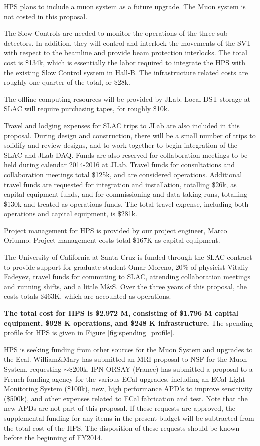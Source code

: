 HPS plans to include a muon system as a future upgrade. The Muon system is not costed in this proposal.

The Slow Controls are needed to monitor the operations of the three sub-detectors. In addition, they will control and interlock the 
movements of the SVT with respect to the beamline and provide beam protection interlocks. The total cost is \$134k, which is essentially 
the labor required to integrate the HPS with the existing Slow Control system in Hall-B. The infrastructure related costs are roughly
one quarter of the total, or \$28k.

The offline computing resources will be provided by JLab. Local DST storage at SLAC will require purchasing tapes, for roughly \$10k. 

Travel and lodging expenses for SLAC trips to JLab are also included in this proposal. During design and construction, 
there will be a small number of trips to solidify and review designs, and to work together to begin integration of the SLAC 
and JLab DAQ. Funds are also reserved for collaboration meetings to be held during calendar 2014-2016 at JLab. Travel funds for
consultations and collaboration meetings total \$125k, and are considered operations. Additional travel funds are requested for integration 
and installation, totalling \$26k, as capital equipment funds, and for commissioning and data taking runs, totalling \$130k and treated as operations 
funds. The total travel expense, including both operations and capital equipment, is \$281k.

Project management for HPS is provided by our project engineer, Marco Oriunno. Project management costs total \$167K as capital equipment.

The University of California at Santa Cruz is funded through the SLAC contract to provide support for graduate student Omar Moreno, 20\% of physicist
Vitaliy Fadeyev, travel funds for commuting to SLAC, attending collaboration meetings and running shifts, and a little M\&S. Over the three
years of this proposal, the costs totals \$463K, which are accounted as operations.


{\bf The total cost for HPS is \$2.972 M, consisting of \$1.796 M capital equipment, \$928 K operations, and \$248 K infrastructure. }
The spending profile for HPS is given in Figure \ref{fig:spending_profile}.

HPS is seeking funding from other sources for the Muon System and upgrades to the Ecal.
William\&Mary has submitted an MRI proposal to NSF for the Muon System, requesting $\sim \$200$k. IPN ORSAY (France) 
has submitted a proposal to a French funding agency for the various ECal upgrades, including an ECal Light Monitoring System (\$100k), new, 
high performance  APD's to improve sensitivity (\$500k), and other expenses related to ECal fabrication and test.
Note that the new APDs are not part of this proposal. If these requests are approved, the supplemental funding for any items in the present 
budget will be subtracted from the total cost of the HPS. The disposition of these requests should be known before the beginning of FY2014.

